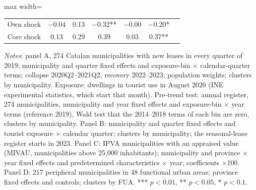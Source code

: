 \begin{table}[!htbp]
\begin{adjustbox}{max width=\linewidth}
\begin{tabular}{lcccccc}
Own shock & $-$0.04 & 0.13 & $-$0.32** & $-$0.00 & $-$0.20* & \\
Core shock & 0.13 & 0.29 & 0.39 & 0.03 & 0.37** & \\
\bottomrule\end{tabular}\end{adjustbox}
\begin{minipage}{0.97\linewidth}\footnotesize\vspace{4pt}
\textit{Notes}: panel A, 274 Catalan municipalities with new leases in every quarter of 2019; municipality and quarter fixed effects and exposure-bin $\times$ calendar-quarter terms; collapse 2020Q2--2021Q2, recovery 2022--2023; population weights; clusters by municipality. Exposure: dwellings in tourist use in August 2020 (INE experimental statistics, which start that month). Pre-trend test: annual register, 274 municipalities, municipality and year fixed effects and exposure-bin $\times$ year terms (reference 2019), Wald test that the 2014--2018 terms of each bin are zero, clusters by municipality. Panel B: municipality and quarter fixed effects and tourist exposure $\times$ calendar quarter; clusters by municipality; the seasonal-lease register starts in 2023. Panel C: IPVA municipalities with an appraised value (MIVAU, municipalities above 25,000 inhabitants); municipality and province $\times$ year fixed effects and predetermined characteristics $\times$ year; coefficients $\times$100. Panel D: 217 peripheral municipalities in 48 functional urban areas; province fixed effects and controls; clusters by FUA. *** $p<0.01$, ** $p<0.05$, * $p<0.1$.
\end{minipage}\end{table}